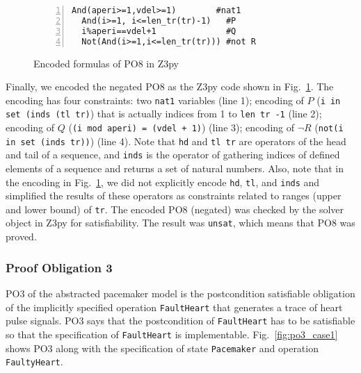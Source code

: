 \begin{figure}[t]
\begin{center}
\begin{mdframed}[roundcorner=5pt,shadow=true]
\begin{Verbatim}[fontsize=\small,numbers=left]
  And(aperi>=1,vdel>=1)        #nat1
  And(i>=1, i<=len_tr(tr)-1)   #P
  i%aperi==vdel+1              #Q
  Not(And(i>=1,i<=len_tr(tr))) #not R
\end{Verbatim}
\end{mdframed}
\vspace{-10pt}
\caption{Encoded formulas of PO8 in Z3py}
\label{fig:po8_encoded_case1}
\end{center}
\end{figure}

Finally, we encoded the negated PO8 as the Z3py code shown in Fig.~\ref{fig:po8_encoded_case1}. The encoding has four constraints: two {\tt nat1} variables (line 1); encoding of $P$ ({\tt i in set (inds (tl tr)}) that is actually indices from 1 to {\tt len tr -1} (line 2); encoding of $Q$ ({\tt (i mod aperi) = (vdel + 1)}) (line 3); encoding of $\neg R$ ({\tt not(i in set (inds tr))}) (line 4). Note that {\tt hd} and {\tt tl tr} are operators of the head and tail of a sequence, and {\tt inds} is the operator of gathering indices of defined elements of a sequence and returns a set of natural numbers. Also, note that in the encoding in Fig.~\ref{fig:po8_encoded_case1}, we did not explicitly encode {\tt hd}, {\tt tl}, and {\tt inds} and simplified the results of these operators as constraints related to ranges (upper and lower bound) of {\tt tr}. The encoded PO8 (negated) was checked by the solver object in Z3py for satisfiability. The result was {\tt unsat}, which means that PO8 was proved.


\subsubsection{Proof Obligation 3}

PO3 of the abstracted pacemaker model is the postcondition satisfiable obligation of the implicitly specified operation {\tt FaultHeart} that generates a trace of heart pulse signals. PO3 says that the postcondition of {\tt FaultHeart} has to be satisfiable so that the specification of {\tt FaultHeart} is implementable. Fig.~\ref{fig:po3_case1} shows PO3 along with the specification of state {\tt Pacemaker} and operation {\tt FaultyHeart}.

